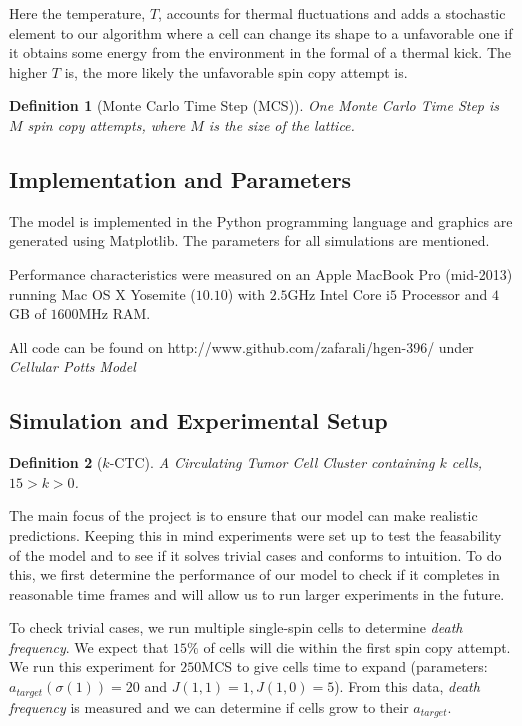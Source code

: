 \documentclass[12pt]{article}
\newtheorem{definition}{Definition}
\begin{document}
Here the temperature, $T$, accounts for thermal fluctuations and adds a stochastic element to our algorithm where a cell can change its shape to a unfavorable one if it obtains some energy from the environment in the formal of a thermal kick. The higher $T$ is, the more likely the unfavorable spin copy attempt is.

\begin{definition}[Monte Carlo Time Step (MCS)] One Monte Carlo Time Step is $M$ spin copy attempts, where $M$ is the size of the lattice.
\end{definition}

\subsection{Implementation and Parameters}
The model is implemented in the Python programming language and graphics are generated using Matplotlib\cite{matplotlib}. The parameters for all simulations are mentioned.

Performance characteristics were measured on an Apple MacBook Pro (mid-2013) running Mac OS X Yosemite ($10.10$) with $2.5$GHz Intel Core i$5$ Processor and $4$GB of $1600$MHz RAM.

All code can be found on http://www.github.com/zafarali/hgen-396/ under \emph{Cellular Potts Model}

\subsection{Simulation and Experimental Setup}
\begin{definition}[$k$-CTC]
A Circulating Tumor Cell Cluster containing $k$ cells, $15>k>0$.
\end{definition}

The main focus of the project is to ensure that our model can make realistic predictions. Keeping this in mind experiments were set up to test the feasability of the model and to see if it solves trivial cases and conforms to intuition. To do this, we first determine the performance of our model to check if it completes in reasonable time frames and will allow us to run larger experiments in the future. 

To check trivial cases, we run multiple single-spin cells to determine \emph{death frequency}. We expect that $15\%$ of cells will die within the first spin copy attempt. We run this experiment for $250$MCS to give cells time to expand (parameters: $a_{target}(\sigma(1))=20$ and $J(1,1)=1, J(1,0)=5$). From this data, \emph{death frequency} is measured and we can determine if cells grow to their $a_{target}$.
\end{document}
